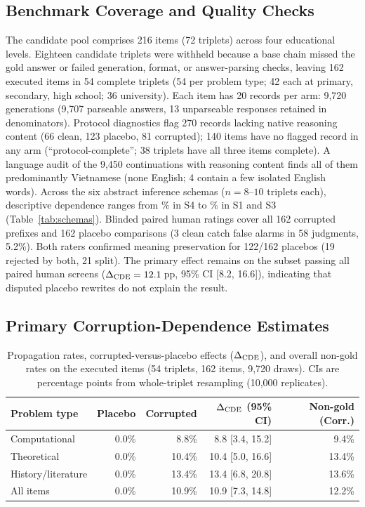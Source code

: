 \subsection{Benchmark Coverage and Quality Checks}
\label{sec:coverage}

The candidate pool comprises 216 items (72 triplets) across four educational levels. Eighteen candidate triplets were withheld because a base chain missed the gold answer or failed generation, format, or answer-parsing checks, leaving 162 executed items in 54 complete triplets (54 per problem type; 42 each at primary, secondary, high school; 36 university). Each item has 20 records per arm: 9,720 generations (9,707 parseable answers, 13 unparseable responses retained in denominators). Protocol diagnostics flag 270 records lacking native reasoning content (66 clean, 123 placebo, 81 corrupted); 140 items have no flagged record in any arm (``protocol-complete''; 38 triplets have all three items complete). A language audit of the 9,450 continuations with reasoning content finds all of them predominantly Vietnamese (none English; 4 contain a few isolated English words). Across the six abstract inference schemas ($n=8\text{--}10$ triplets each), descriptive dependence ranges from \SFourCDE\% in S4 to \SOneCDE\% in S1 and S3 (Table~\ref{tab:schemas}). Blinded paired human ratings cover all 162 corrupted prefixes and 162 placebo comparisons (3 clean catch false alarms in 58 judgments, 5.2\%). Both raters confirmed meaning preservation for 122/162 placebos (19 rejected by both, 21 split). The primary effect remains on the subset passing all paired human screens ($\Delta_{\mathrm{CDE}} = 12.1$\,pp, 95\% CI [8.2, 16.6]), indicating that disputed placebo rewrites do not explain the result.

\subsection{Primary Corruption-Dependence Estimates}

\begin{table}[!htb]\centering\small\setlength{\tabcolsep}{2.5pt}
\caption{Propagation rates, corrupted-versus-placebo effects ($\Delta_{\mathrm{CDE}}$), and overall non-gold rates on the executed items (54 triplets, 162 items, 9,720 draws). CIs are percentage points from whole-triplet resampling (10,000 replicates).}
\label{tab:preliminary}
\begin{tabular}{@{}lrrrr@{}}
\toprule Problem type & Placebo & Corrupted & $\Delta_{\mathrm{CDE}}$ (95\% CI) & Non-gold (Corr.) \\
\midrule
Computational & 0.0\% & 8.8\% & 8.8 [3.4, 15.2] & 9.4\% \\
Theoretical & 0.0\% & 10.4\% & 10.4 [5.0, 16.6] & 13.4\% \\
History/literature & 0.0\% & 13.4\% & 13.4 [6.8, 20.8] & 13.6\% \\
\midrule
All items & 0.0\% & 10.9\% & 10.9 [7.3, 14.8] & 12.2\% \\
\bottomrule\end{tabular}
\end{table}

